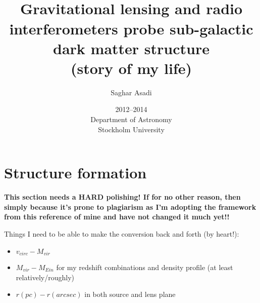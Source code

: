 \documentclass[paper=a4, fontsize=11pt]{scrartcl} %
\title{    
\normalfont \normalsize 
\horrule{0.5pt} \\[0.4cm] %
\huge  Gravitational lensing and radio interferometers probe sub-galactic dark matter structure\\
\large (story of my life) %
\horrule{2pt} \\[0.5cm] %
}
\author{Saghar Asadi} %
\date{\normalsize 2012--2014 \\ Department of Astronomy \\ Stockholm University} %
\numberwithin{equation}{section} %
\numberwithin{figure}{section} %
\numberwithin{table}{section} %
\begin{document}
\maketitle %
\newpage
\tableofcontents
\newpage

\begin{abstract}
\end{abstract}

\newpage
\section{Structure formation}
\label{sec:structure formation}
{\bf This section needs a HARD polishing! If for no other reason, then simply because it's prone to plagiarism as I'm adopting the framework from this reference of mine and have not changed it much yet!!}

Things I need to be able to make the conversion back and forth (by heart!):
\begin{itemize}
\item $v_{circ} - M_{vir}$
\item $M_{vir} - M_{Ein}$ for my redshift combinations and density profile (at least relatively/roughly)
\item $r (pc) - r (arcsec)$ in both source and lens plane
\end{itemize}
\end{document}

